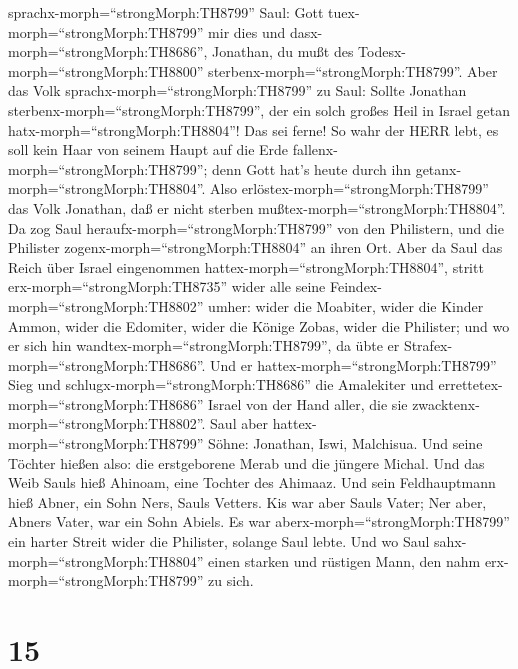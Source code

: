 sprachx-morph=``strongMorph:TH8799'' Saul: Gott
tuex-morph=``strongMorph:TH8799'' mir dies und
dasx-morph=``strongMorph:TH8686'', Jonathan, du mußt des
Todesx-morph=``strongMorph:TH8800''
sterbenx-morph=``strongMorph:TH8799''.  Aber das Volk
sprachx-morph=``strongMorph:TH8799'' zu Saul: Sollte Jonathan
sterbenx-morph=``strongMorph:TH8799'', der ein solch großes Heil in
Israel getan hatx-morph=``strongMorph:TH8804''! Das sei ferne! So wahr
der HERR lebt, es soll kein Haar von seinem Haupt auf die Erde
fallenx-morph=``strongMorph:TH8799''; denn Gott hat's heute durch ihn
getanx-morph=``strongMorph:TH8804''. Also
erlöstex-morph=``strongMorph:TH8799'' das Volk Jonathan, daß er nicht
sterben mußtex-morph=``strongMorph:TH8804''.  Da zog Saul
heraufx-morph=``strongMorph:TH8799'' von den Philistern, und die
Philister zogenx-morph=``strongMorph:TH8804'' an ihren Ort.
 Aber da Saul das Reich über Israel eingenommen
hattex-morph=``strongMorph:TH8804'', stritt
erx-morph=``strongMorph:TH8735'' wider alle seine
Feindex-morph=``strongMorph:TH8802'' umher: wider die Moabiter, wider
die Kinder Ammon, wider die Edomiter, wider die Könige Zobas, wider die
Philister; und wo er sich hin wandtex-morph=``strongMorph:TH8799'', da
übte er Strafex-morph=``strongMorph:TH8686''.  Und er
hattex-morph=``strongMorph:TH8799'' Sieg und
schlugx-morph=``strongMorph:TH8686'' die Amalekiter und
errettetex-morph=``strongMorph:TH8686'' Israel von der Hand aller, die
sie zwacktenx-morph=``strongMorph:TH8802''.  Saul aber
hattex-morph=``strongMorph:TH8799'' Söhne: Jonathan, Iswi, Malchisua.
Und seine Töchter hießen also: die erstgeborene Merab und die jüngere
Michal.  Und das Weib Sauls hieß Ahinoam, eine Tochter des
Ahimaaz. Und sein Feldhauptmann hieß Abner, ein Sohn Ners, Sauls
Vetters.  Kis war aber Sauls Vater; Ner aber, Abners Vater,
war ein Sohn Abiels.  Es war
aberx-morph=``strongMorph:TH8799'' ein harter Streit wider die
Philister, solange Saul lebte. Und wo Saul
sahx-morph=``strongMorph:TH8804'' einen starken und rüstigen Mann, den
nahm erx-morph=``strongMorph:TH8799'' zu sich.

\hypertarget{section-14}{%
\section{15}\label{section-14}}


